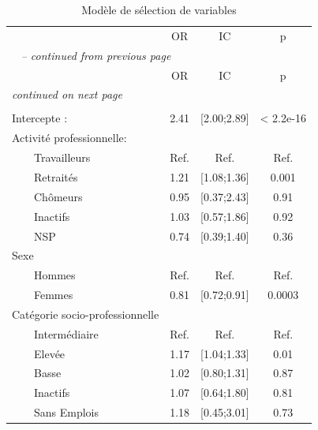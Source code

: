 \documentclass{book}
\begin{document}
    \begin{longtable}{lccc}\caption{Modèle de sélection de variables}\\
    \hline  
     &                \multirow{2}{*}{OR}    & \multirow{2}{*}{IC} & \multirow{2}{*}{p}\\ 
 &     &                        &         \\ 
  
    \hline
    \hline     
    \endfirsthead 
    \multicolumn{4}{l}{\tablename\ \thetable{} \textit{-- continued from previous page}}\\ 
    \hline
    &                     \multirow{2}{*}{OR}    & \multirow{2}{*}{IC} & \multirow{2}{*}{p}\\ 
 &     &                     &         \\ 

    \hline
    \hline  
    \endhead   
    \hline
    \multicolumn{4}{l}{\textit{continued on next page}} \\ 
    \endfoot   
    \multicolumn{4}{l}{}  \\ 
    \endlastfoot

Intercepte : &2.41 & [2.00;2.89] &< 2.2e-16 \\    
Activité professionnelle:  &         &              &                         \\ 
$\qquad$Travailleurs & Ref.& Ref. & Ref.             \\ 
$\qquad$Retraités &1.21&[1.08;1.36] &0.001\\
$\qquad$Chômeurs   & 0.95& [0.37;2.43]& 0.91\\ 
$\qquad$Inactifs &1.03& [0.57;1.86] &0.92\\
$\qquad$NSP  &0.74&[0.39;1.40] &0.36\\ 

Sexe&&&\\
$\qquad$Hommes & Ref.& Ref. & Ref.             \\
$\qquad$Femmes &0.81 &[0.72;0.91] &0.0003\\
 
Catégorie socio-professionnelle&&&\\
$\qquad$Intermédiaire& Ref.&Ref.&Ref.\\ 
$\qquad$Elevée &1.17& [1.04;1.33] &0.01\\ 
$\qquad$Basse &1.02& [0.80;1.31] &0.87\\
$\qquad$Inactifs   &1.07& [0.64;1.80] &0.81\\
$\qquad$Sans Emplois &1.18 &[0.45;3.01] &0.73\\


\end{longtable}
\end{document}
